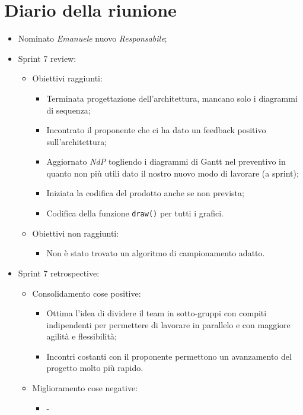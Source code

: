 \section{Diario della riunione}
\begin{itemize}
  \item Nominato \textit{Emanuele} nuovo \textit{Responsabile};
  \item Sprint 7 review:
        \begin{itemize}
          \item Obiettivi raggiunti:
                \begin{itemize}
                  \item Terminata progettazione dell'architettura, mancano solo i diagrammi di sequenza;
                  \item Incontrato il proponente che ci ha dato un feedback positivo sull'architettura;
                  \item Aggiornato \textit{NdP} togliendo i diagrammi di Gantt nel preventivo in quanto non più utili dato il nostro nuovo modo di lavorare (a sprint);
                  \item Iniziata la codifica del prodotto anche se non prevista;
                  \item Codifica della funzione \texttt{draw()} per tutti i grafici.
                \end{itemize}
          \item Obiettivi non raggiunti:
                \begin{itemize}
                  \item Non è stato trovato un algoritmo di campionamento adatto.
                \end{itemize}
        \end{itemize}
\end{itemize}


\begin{itemize}
  \item Sprint 7 retrospective:
        \begin{itemize}
          \item Consolidamento cose positive:
                \begin{itemize}
                  \item Ottima l'idea di dividere il team in sotto-gruppi con compiti indipendenti per permettere di lavorare in parallelo e con maggiore agilità e flessibilità;
                  \item Incontri costanti con il proponente permettono un avanzamento del progetto molto più rapido.
                \end{itemize}
          \item Miglioramento cose negative:
                \begin{itemize}
                  \item -
                \end{itemize}
        \end{itemize}
\end{itemize}


